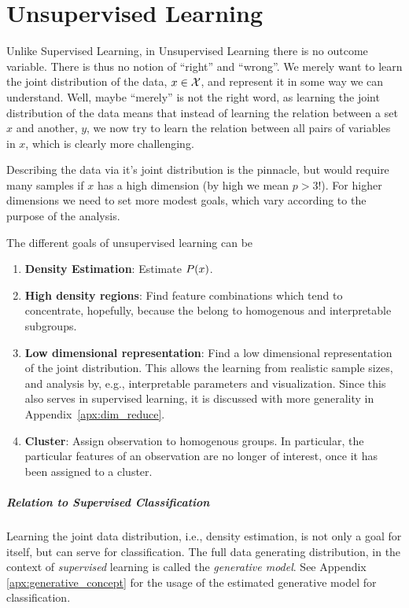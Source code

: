 
\chapter{Unsupervised Learning}

\label{sec:unsupervised}

Unlike Supervised Learning, in Unsupervised Learning there is no outcome variable. 
There is thus no notion of ``right'' and ``wrong''. 
We merely want to learn the joint distribution of the data, $x \in \mathcal{X}$, and represent it in some way we can understand. 
Well, maybe ``merely'' is not the right word, as learning the joint distribution of the data means that instead of learning the relation between a set $x$ and another, $y$, we now try to learn the relation between all pairs of variables in $x$, which is clearly more challenging. 

Describing the data via it's joint distribution is the pinnacle, but would require many samples if $x$ has a high dimension (by high we mean $p>3$!). For higher dimensions we need to set more modest goals, which vary according to the purpose of the analysis.

The different goals of unsupervised learning can be
\begin{enumerate}
\item \textbf{Density Estimation}: Estimate $P(x)$.
\item \textbf{High density regions}: Find feature combinations which tend to concentrate, hopefully, because the belong to homogenous and interpretable subgroups.
\item \textbf{Low dimensional representation}: Find a low dimensional representation of the joint distribution. This allows the learning from realistic sample sizes, and analysis by, e.g., interpretable parameters and visualization.
Since this also serves in supervised learning, it is discussed with more generality in Appendix~\ref{apx:dim_reduce}.
\item \textbf{Cluster}: Assign observation to homogenous groups. In particular, the particular features of an observation are no longer of interest, once it has been assigned to a cluster.
\end{enumerate}


\paragraph{Relation to Supervised Classification}
Learning the joint data distribution, i.e., density estimation, is not only a goal for itself, but can serve for classification. 
The full data generating distribution, in the context of \emph{supervised} learning is called the \emph{generative model}.
See Appendix \ref{apx:generative_concept} for the usage of the estimated generative model for classification.




